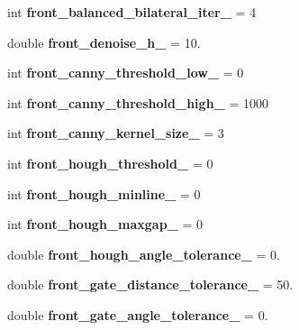 \begin{DoxyCompactItemize}
int {\bfseries front\+\_\+balanced\+\_\+bilateral\+\_\+iter\+\_\+} = 4
\item 
\mbox{\label{classMarkerDropper_a576351ceb624124a9f177e4aa10e72b0}} 
double {\bfseries front\+\_\+denoise\+\_\+h\+\_\+} = 10.
\item 
\mbox{\label{classMarkerDropper_a97e708ac1dc23f14efe48c64e3eb0496}} 
int {\bfseries front\+\_\+canny\+\_\+threshold\+\_\+low\+\_\+} = 0
\item 
\mbox{\label{classMarkerDropper_ada1f7cb1f635913c6b9612fa890526af}} 
int {\bfseries front\+\_\+canny\+\_\+threshold\+\_\+high\+\_\+} = 1000
\item 
\mbox{\label{classMarkerDropper_aa3d54dfdca7a35d676e0036f085bf14f}} 
int {\bfseries front\+\_\+canny\+\_\+kernel\+\_\+size\+\_\+} = 3
\item 
\mbox{\label{classMarkerDropper_abca1ba7eace809915a9c674cc9134a28}} 
int {\bfseries front\+\_\+hough\+\_\+threshold\+\_\+} = 0
\item 
\mbox{\label{classMarkerDropper_a96fb9649f9d3c5d94e99705ec8c70f52}} 
int {\bfseries front\+\_\+hough\+\_\+minline\+\_\+} = 0
\item 
\mbox{\label{classMarkerDropper_aba7342ce88e06358356298b4fd4c797f}} 
int {\bfseries front\+\_\+hough\+\_\+maxgap\+\_\+} = 0
\item 
\mbox{\label{classMarkerDropper_a5cce65c39a401bd6d966d3449c990960}} 
double {\bfseries front\+\_\+hough\+\_\+angle\+\_\+tolerance\+\_\+} = 0.
\item 
\mbox{\label{classMarkerDropper_a01d2f9bee667f199b5bc2e8f55ef0ca9}} 
double {\bfseries front\+\_\+gate\+\_\+distance\+\_\+tolerance\+\_\+} = 50.
\item 
\mbox{\label{classMarkerDropper_a5c2afc4167d551e1854fcad96398703f}} 
double {\bfseries front\+\_\+gate\+\_\+angle\+\_\+tolerance\+\_\+} = 0.
\item 

\end{DoxyCompactItemize}
